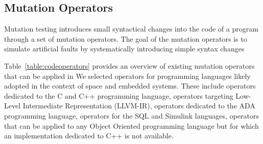 
\subsection{Mutation Operators}
\label{sec:operators}

Mutation testing introduces small syntactical changes into the code of a program  through a set of mutation operators.
The goal of the mutation operators is to simulate artificial faults by systematically introducing  simple syntax changes 


Table~\ref{table:codeoperators} provides an overview of existing mutation operators that can be applied in 
We selected operators for programming languages likely adopted in the context of space and embedded systems. These include operators dedicated to the C and C++ programming language, operators targeting Low-Level Intermediate Representation (LLVM-IR), operators dedicated to the ADA programming language, operators for the SQL and Simulink languages, operators that can be applied to any Object Oriented programming language but for which an implementation dedicated to C++ is not available.

